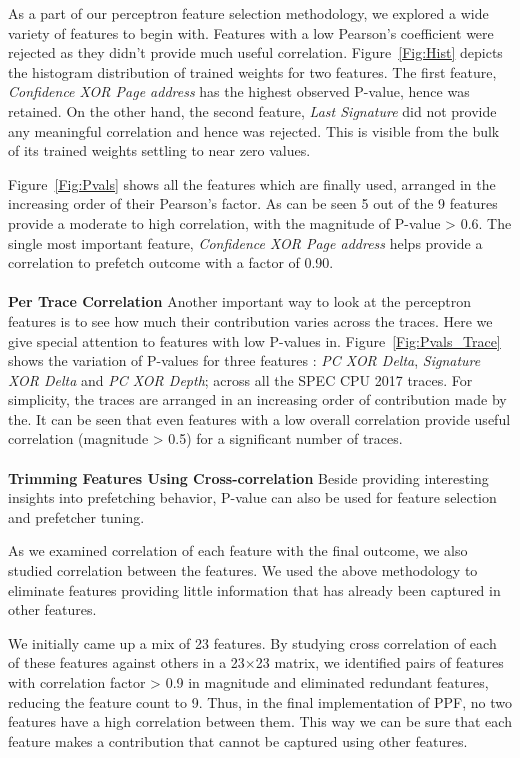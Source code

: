 As a part of our perceptron feature selection methodology, we explored a wide 
variety of features to begin with. Features with a low 
Pearson's coefficient were rejected as they didn't provide much useful 
correlation. Figure~\ref{Fig:Hist} depicts the histogram distribution of 
trained weights for two features. The first feature, 
\textit{Confidence XOR Page address} has the highest observed P-value, 
hence was retained. On the other hand, the second feature, \textit{Last Signature}
did not provide any meaningful correlation and hence was rejected. 
This is visible from the bulk of its trained weights settling to near zero values.

Figure~\ref{Fig:Pvals} shows all the features which are finally used, 
arranged in the increasing order of their Pearson's factor. 
As can be seen 5 out of the 9 features provide a moderate to high 
correlation, with the magnitude of P-value > 0.6. The single most 
important feature, \textit{Confidence XOR Page address} helps provide
a correlation to prefetch outcome with a factor of 0.90. \\ \\
%
\textbf{Per Trace Correlation} \newline Another important way to look
at the perceptron features is to see how much their contribution
varies across the traces. Here we give special attention to features
with low P-values in. Figure~\ref{Fig:Pvals_Trace} shows the
variation of P-values for three features : \textit{PC XOR Delta},
\textit{Signature XOR Delta} and 
\textit{PC XOR Depth}; across all the SPEC CPU 2017 traces. 
For simplicity, the traces are arranged in an
increasing order of contribution made by the. 
It can be seen that even features with a low
overall correlation provide useful correlation (magnitude > 0.5) for
a significant number of traces. \\ \\
%
\textbf{Trimming Features Using Cross-correlation} \newline Beside
providing interesting insights into prefetching behavior, P-value can
also be used for feature selection and prefetcher tuning.

As we examined correlation of each feature with the final outcome, we also
studied correlation between the features. We used the above methodology to
eliminate features providing little information that has already been captured
in other features.

We initially came up a mix of 23 features. By studying
cross correlation of each of these features against others in a 23$\times$23
matrix, we identified pairs of features with correlation factor > 0.9 in
magnitude and eliminated redundant features, reducing the feature count to 9.
Thus, in the final implementation of PPF, no two features have a high
correlation between them. This way we can be sure that each feature makes a
contribution that cannot be captured using other features.

